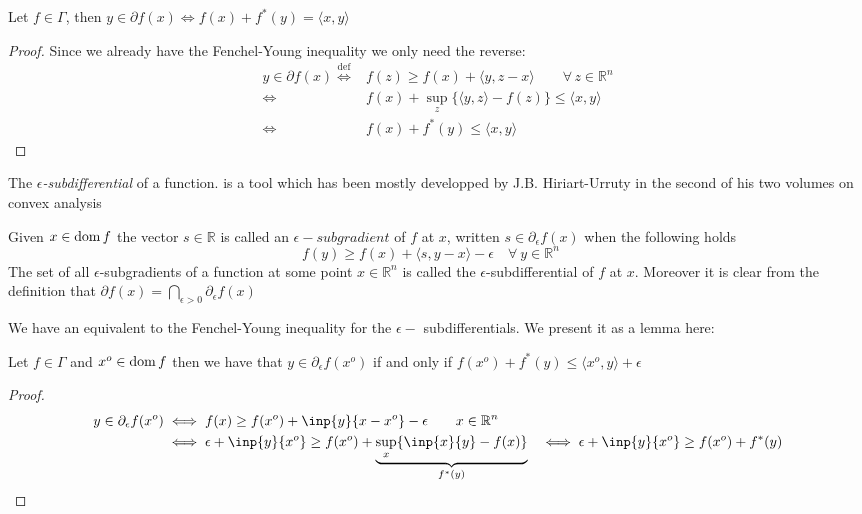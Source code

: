 \begin{lemma}\label{fenchelDualLemma}
	Let $f\in \Gamma$, then $y\in \partial f(x) \iff 
	f(x) + f^*(y) = \langle x,y \rangle $
\end{lemma}
\begin{proof}
Since we already have the Fenchel-Young inequality we only need the reverse:
\begin{align*}
	y \in \partial f(x) \overset{\mathrm{def}}{\iff}&
	f(z)\geq f(x) +\langle y,z-x\rangle 
	\qquad \forall \, z\in\mathbb R^n\\
	\iff& f(x) + \sup_z\{\langle
	y,z\rangle -f(z)\}
	\leq \langle x,y \rangle \\
	\iff& f(x)+ f^*(y) \leq \langle x,y\rangle
\end{align*}
\end{proof}
\newpage
The  \emph{$\epsilon$-subdifferential} of a function.  is a tool which has been
mostly developped by J.B. Hiriart-Urruty in the second of his two volumes on
convex analysis \autocite[92]{hiriart1993convex} 
\begin{definition} 
	Given $x\in\mathrm{dom} \, f$ the vector $s\in \mathbb R$ is called
	an $\epsilon-subgradient$ of $f$ at $x$, written $s\in
	\partial_\epsilon f(x)$ when the following holds
	\begin{equation*}
		f(y) \geq f(x) + \langle s,y-x\rangle -\epsilon 
		\quad \forall \ y \in \mathbb R^n \quad
	\end{equation*}
The set of all $\epsilon$-subgradients of a function at some point
$x\in\mathbb R^n$ is called the $\epsilon$-subdifferential of $f$ at $x$.
Moreover it is clear from the definition that
$\partial f(x) = \bigcap_{\epsilon>0}\partial_{\epsilon}f(x)$
\end{definition}

We have an equivalent to the Fenchel-Young inequality for the $\epsilon-$
subdifferentials. We present it as a lemma here:
\begin{lemma}
	Let $f\in\Gamma$ and $x^o \in\mathrm{dom} \, f$ then we have that
	$y \in\partial_\epsilon f(x^o)$ if and only if 
	$f(x^o)+f^*(y) \leq \langle x^o,y\rangle + \epsilon$ 
	\label{FYepsilon}
\end{lemma}
\begin{proof}
	\begin{align*}
		y\in\partial_\epsilon f(x^o) &\iff 
		f(x) \geq f(x^o) + \inp{y}{x-x^o} - \epsilon
		\qquad x\in\mathbb R^n \\
		&\iff \epsilon + \inp{y}{x^o} \geq f(x^o) 
		+\underbrace{\sup_x \{\inp{x}{y} - f(x)\}}_{f^*(y)}
		&\iff \epsilon + \inp{y}{x^o} \geq f(x^o) + f^*(y)
\end{align*}

\end{proof}
